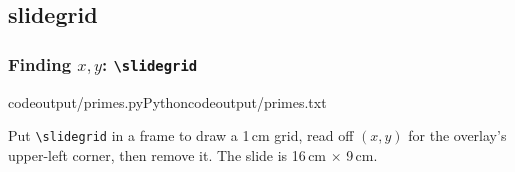 \documentclass[aspectratio=169,10pt,compress]{beamer}
\begin{document}
\subsection[slidegrid]{slidegrid}

\begin{frame}[t,fragile] \frametitle{Finding $x,y$: \texttt{\textbackslash slidegrid}}
  \slidegrid
  \lstcodeoverlaystep[basicstyle=\ttfamily\scriptsize][][0.4\textwidth]{8.9cm,2.1cm}%
    {codeoutput/primes.py}{Python}{codeoutput/primes.txt}

  \small Put \verb|\slidegrid| in a frame to draw a 1\,cm grid, read off $(x,y)$ for the
  overlay's upper-left corner, then remove it. The slide is 16\,cm $\times$ 9\,cm.
\end{frame}
\end{document}
